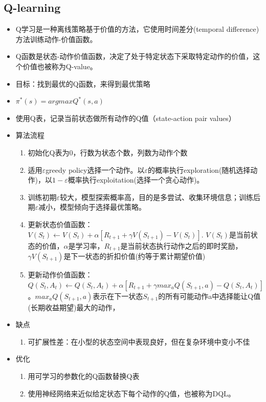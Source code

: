 \documentclass[UTF8]{ctexart}
\begin{document}
\subsection{Q-learning}
\begin{itemize}
    \item Q学习是一种离线策略基于价值的方法，它使用时间差分(temporal difference)方法训练动作-价值函数。
    \item Q函数是状态-动作价值函数，决定了处于特定状态下采取特定动作的价值，这个价值也被称为Q-value。
    \item 目标：找到最优的Q函数，来得到最优策略
    \item $\pi^{*}(s)=argmaxQ^{*}(s,a)$
    \item 使用Q表，记录当前状态做所有动作的Q值（state-action pair values）
    \item 算法流程
    \begin{enumerate}
        \item 初始化Q表为0，行数为状态个数，列数为动作个数
        \item 适用$\varepsilon $greedy policy选择一个动作。以$\varepsilon $的概率执行exploration(随机选择动作)，以$1-\varepsilon $概率执行exploitation(选择一个贪心动作)。
        \item 训练初期$\varepsilon $较大，模型探索概率高，目的是多尝试、收集环境信息；训练后期$\varepsilon $减小，模型倾向于选择最优策略。
        \item 更新状态价值函数：$V(S_{t})\leftarrow V(S_{t})+\alpha[R_{t+1}+\gamma V(S_{t+1})-V(S_{t})]$. $V(S_{t})$是当前状态的价值，$\alpha$是学习率，$R_{t+1}$是当前状态执行动作之后的即时奖励，$\gamma V(S_{t+1})$是下一状态的折扣价值(约等于累计期望价值)
        \item 更新动作价值函数：$Q(S_{t},A_{t})\leftarrow Q(S_{t},A_{t})+\alpha [R_{t+1}+\gamma max_{a}Q(S_{t+1},a)-Q(S_{t},A_{t})]$。$max_{a}Q(S_{t+1},a)$表示在下一状态$S_{t+1}$的所有可能动作a中选择能让Q值(长期收益期望)最大的动作，
    \end{enumerate}
    \item 缺点
    \begin{enumerate}
        \item 可扩展性差：在小型的状态空间中表现良好，但在复杂环境中变小不佳
    \end{enumerate}
    \item 优化
    \begin{enumerate}
        \item 用可学习的参数化的Q函数替换Q表
        \item 使用神经网络来近似给定状态下每个动作的Q值，也被称为DQL。
    \end{enumerate}
\end{itemize}
\end{document}
